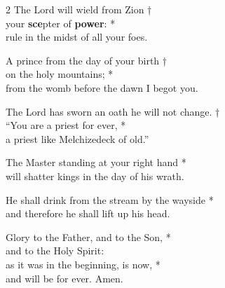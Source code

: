 

\begin{multicols}{2}
    \small
    The Lord will wield from Zion †\\
    your \textbf{sce}pter of \textbf{power}: *\\
    rule in the midst of all your foes.
    
    A prince from the day of your birth †\\
    on the holy mountains; *\\
    from the womb before the dawn I begot you.
    
    The Lord has sworn an oath he will not change. †\\
    “You are a priest for ever, *\\
    a priest like Melchizedeck of old.”
    
    The Master standing at your right hand *\\
    will shatter kings in the day of his wrath.
    
    He shall drink from the stream by the wayside *\\
    and therefore he shall lift up his head.
    
    Glory to the Father, and to the Son, *\\
    and to the Holy Spirit:\\
    as it was in the beginning, is now, *\\
    and will be for ever. Amen.        
\end{multicols}

